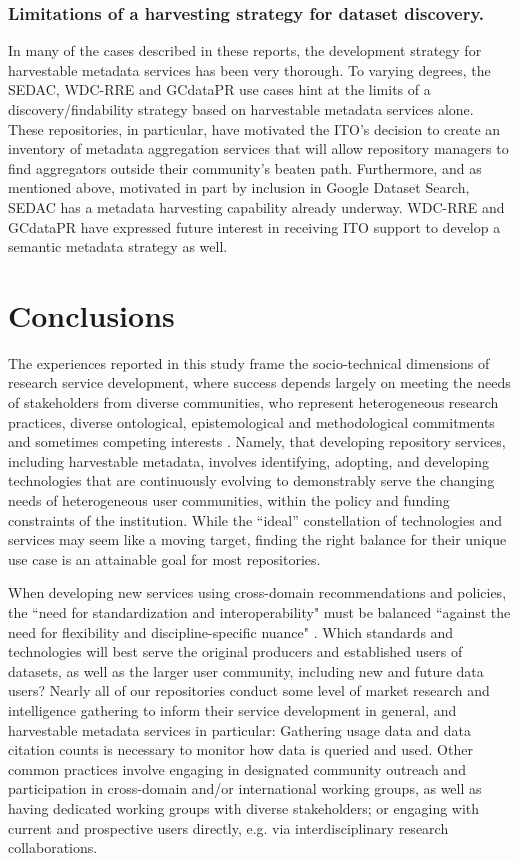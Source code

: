 \documentclass{interact}
\begin{document}
\subsubsection{Limitations of a harvesting strategy for dataset discovery.}
In many of the cases described in these reports, the development strategy for harvestable metadata services has been very thorough. To varying degrees, the SEDAC, WDC-RRE and GCdataPR use cases hint at the limits of a discovery/findability strategy based on harvestable metadata services alone. These repositories, in particular, have motivated the ITO’s decision to create an inventory of metadata aggregation services \parencite{li_searchable_2021} that will allow repository managers to find aggregators outside their community’s beaten path. Furthermore, and as mentioned above, motivated in part by inclusion in Google Dataset Search, SEDAC has a metadata harvesting capability already underway. WDC-RRE and GCdataPR have expressed future interest in receiving ITO support to develop a semantic metadata strategy as well.

\section{Conclusions}\label{conclusion}

The experiences reported in this study frame the socio-technical dimensions of research service development, where success depends largely on meeting the needs of stakeholders from diverse communities, who represent heterogeneous research practices, diverse ontological, epistemological and methodological commitments and sometimes competing interests \parencite{poirier_data_2019}. Namely, that developing repository services, including harvestable metadata, involves identifying, adopting, and developing technologies that are continuously evolving to demonstrably
serve the changing needs of heterogeneous user communities, within the policy and funding constraints of the institution. While the ``ideal'' constellation of technologies and services may seem like a moving target, finding the right balance for their unique use case is an attainable goal for most repositories.

When developing new services using cross-domain recommendations and policies, the ``need for standardization and interoperability" must be balanced ``against the need for flexibility and discipline-specific nuance" \parencite{goddard_rdm_2021}. Which standards and technologies will best serve the original producers and established users of datasets, as well as the larger user community, including new and future data users? Nearly all of our repositories conduct some level of market research and intelligence gathering to inform their service development in general, and harvestable metadata services in particular: Gathering usage data and data citation counts is necessary to monitor how data is queried and used. Other common practices involve engaging in designated community outreach and participation in cross-domain and/or international working groups, as well as having dedicated working groups with diverse stakeholders; or engaging with current and prospective users directly, e.g. via interdisciplinary research collaborations.
\end{document}
